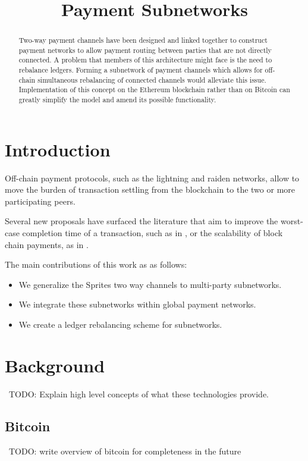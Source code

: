 \documentclass[12pt]{article}
\title{Payment Subnetworks\vspace{-4.5em}}
\date{}
\author{}
\newcommand{\todo}[1]{{\color{red}\ TODO: {#1}}}
\begin{document}
\maketitle
\begin{abstract}
Two-way payment channels have been designed and linked together to construct payment networks to allow payment routing between parties that are not directly connected. A problem that members of this architecture might face is the need to rebalance ledgers. Forming a subnetwork of payment channels which allows for off-chain simultaneous rebalancing of connected channels would alleviate this issue. Implementation of this concept on the Ethereum blockchain rather than on Bitcoin can greatly simplify the model and amend its possible functionality.
\end{abstract}

\section{Introduction}
Off-chain payment protocols, such as the lightning \cite{lightning} and raiden \cite{raiden} networks, allow to move the burden of transaction settling from the blockchain to the two or more participating peers. 

Several new proposals have surfaced the literature that aim to improve the worst-case completion time of a transaction, such as in \cite{sprites}, or the scalability of block chain payments, as in \cite{scale}.

The main contributions of this work as as follows:

\begin{itemize}
	\item We generalize the Sprites \cite{sprites} two way channels to multi-party subnetworks.
	\item We integrate these subnetworks within global payment networks.
	\item We create a ledger rebalancing scheme for subnetworks.
\end{itemize}

\section{Background}
\todo{Explain high level concepts of what these technologies provide.}

\subsection{Bitcoin}
\todo{write overview of bitcoin for completeness in the future} \cite{bitcoin}
\end{document}
